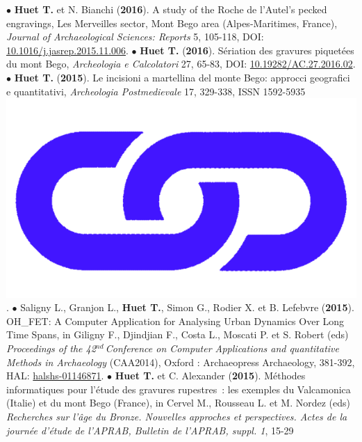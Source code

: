 \documentclass{article}
\begin{document}
\smallbreak
$\bullet$ \textbf{Huet T.} et N. Bianchi (\textbf{2016}). A study of the Roche de l'Autel's pecked engravings, Les Merveilles sector, Mont Bego area (Alpes-Maritimes, France), \textit{Journal of Archaeological Sciences: Reports} 5, 105-118, DOI: \href{https://doi.org/10.1016/j.jasrep.2015.11.006}{10.1016/j.jasrep.2015.11.006}.
\smallbreak
$\bullet$ \textbf{Huet T.} (\textbf{2016}). S\'{e}riation des gravures piquet\'{e}es du mont Bego, \textit{Archeologia e Calcolatori} 27, 65-83, DOI: \href{https://doi.org/10.19282/AC.27.2016.02}{10.19282/AC.27.2016.02}.
\smallbreak
$\bullet$ \textbf{Huet T.} (\textbf{2015}). Le incisioni a martellina del monte Bego: approcci geografici e quantitativi, \textit{Archeologia Postmedievale} 17, 329-338, ISSN 1592-5935 \href{https://www.insegnadelgiglio.it/wp-content/uploads/2015/01/APM_17_libro-anteprima.pdf}{\includegraphics[scale=0.015]{link_darkblue.png}}.
\smallbreak
$\bullet$ Saligny L., Granjon L., \textbf{Huet T.}, Simon G., Rodier X. et B. Lefebvre (\textbf{2015}). OH\_FET: A Computer Application for Analysing Urban Dynamics Over Long Time Spans, in Giligny F., Djindjian F., Costa L., Moscati P. et S. Robert (eds) \textit{Proceedings of the 42${}^{nd\ }$Conference on Computer Applications and quantitative Methods in Archaeology} (CAA2014), Oxford : Archaeopress Archaeology, 381-392, HAL: \href{https://hal.archives-ouvertes.fr/halshs-01146871}{halshs-01146871}.
\smallbreak
$\bullet$ \textbf{Huet T.} et C. Alexander (\textbf{2015}). M\'{e}thodes informatiques pour l'\'{e}tude des gravures rupestres~: les exemples du Valcamonica (Italie) et du mont Bego (France), in Cervel M., Rousseau L. et M. Nordez (eds) \textit{Recherches sur l'\^{a}ge du Bronze. Nouvelles approches et perspectives. Actes de la journ\'{e}e d'\'{e}tude de l'APRAB, Bulletin de l'APRAB, suppl. 1}, 15-29 
\end{document}
